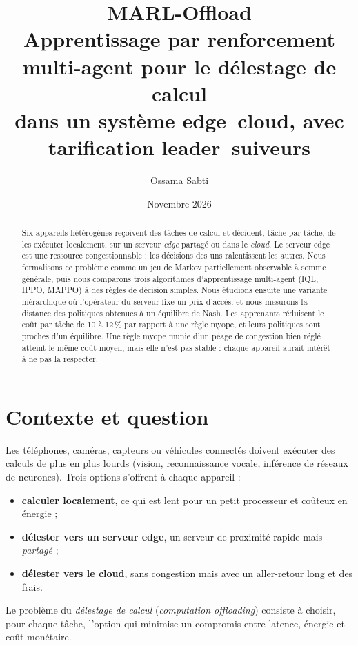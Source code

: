 \documentclass[11pt,a4paper]{article}
\title{\textbf{MARL-Offload}\\[4pt]
\large Apprentissage par renforcement multi-agent pour le délestage de calcul\\
dans un système edge--cloud, avec tarification leader--suiveurs}
\author{Ossama Sabti}
\date{Novembre 2026}
\begin{document}
\maketitle

\begin{abstract}
\noindent Six appareils hétérogènes reçoivent des tâches de calcul et décident, tâche par tâche, de les exécuter
localement, sur un serveur \emph{edge} partagé ou dans le \emph{cloud}. Le serveur edge est une ressource
congestionnable : les décisions des uns ralentissent les autres. Nous formalisons ce problème comme un jeu de
Markov partiellement observable à somme générale, puis nous comparons trois algorithmes d'apprentissage
multi-agent (IQL, IPPO, MAPPO) à des règles de décision simples. Nous étudions ensuite une variante hiérarchique
où l'opérateur du serveur fixe un prix d'accès, et nous mesurons la distance des politiques obtenues à un
équilibre de Nash. Les apprenants réduisent le coût par tâche de 10 à 12\,\% par rapport à une règle myope, et
leurs politiques sont proches d'un équilibre. Une règle myope munie d'un péage de congestion bien réglé atteint
le même coût moyen, mais elle n'est pas stable : chaque appareil aurait intérêt à ne pas la respecter.
\end{abstract}

\tableofcontents
\newpage

\section{Contexte et question}

Les téléphones, caméras, capteurs ou véhicules connectés doivent exécuter des calculs de plus en plus lourds
(vision, reconnaissance vocale, inférence de réseaux de neurones). Trois options s'offrent à chaque appareil :
\begin{itemize}
  \item \textbf{calculer localement}, ce qui est lent pour un petit processeur et coûteux en énergie ;
  \item \textbf{délester vers un serveur edge}, un serveur de proximité rapide mais \emph{partagé} ;
  \item \textbf{délester vers le cloud}, sans congestion mais avec un aller-retour long et des frais.
\end{itemize}
Le problème du \emph{délestage de calcul} (\emph{computation offloading}) consiste à choisir, pour chaque tâche,
l'option qui minimise un compromis entre latence, énergie et coût monétaire.
\end{document}
